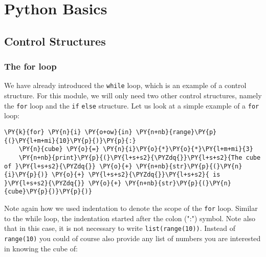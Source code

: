 \section{Python Basics}\label{python-basics}

\subsection{Control Structures}\label{control-structures}

\subsubsection{The for loop}\label{the-for-loop}

    We have already introduced the \texttt{while} loop, which is an example
of a control structure. For this module, we will only need two other
control structures, namely the \texttt{for} loop and the \texttt{if}
\texttt{else} structure. Let us look at a simple example of a
\texttt{for} loop:

    \begin{tcolorbox}[breakable, size=fbox, boxrule=1pt, pad at break*=1mm,colback=cellbackground, colframe=cellborder]
\begin{Verbatim}[commandchars=\\\{\}]
\PY{k}{for} \PY{n}{i} \PY{o+ow}{in} \PY{n+nb}{range}\PY{p}{(}\PY{l+m+mi}{10}\PY{p}{)}\PY{p}{:}
    \PY{n}{cube} \PY{o}{=} \PY{n}{i}\PY{o}{*}\PY{o}{*}\PY{l+m+mi}{3}
    \PY{n+nb}{print}\PY{p}{(}\PY{l+s+s2}{\PYZdq{}}\PY{l+s+s2}{The cube of }\PY{l+s+s2}{\PYZdq{}} \PY{o}{+} \PY{n+nb}{str}\PY{p}{(}\PY{n}{i}\PY{p}{)} \PY{o}{+} \PY{l+s+s2}{\PYZdq{}}\PY{l+s+s2}{ is }\PY{l+s+s2}{\PYZdq{}} \PY{o}{+} \PY{n+nb}{str}\PY{p}{(}\PY{n}{cube}\PY{p}{)}\PY{p}{)}
\end{Verbatim}
\end{tcolorbox}

    Note again how we used indentation to denote the scope of the
\texttt{for} loop. Similar to the while loop, the indentation started
after the colon (":") symbol. Note also that in this case, it is not
necessary to write \texttt{list(range(10))}. Instead of
\texttt{range(10)} you could of course also provide any list of numbers
you are interested in knowing the cube of:


